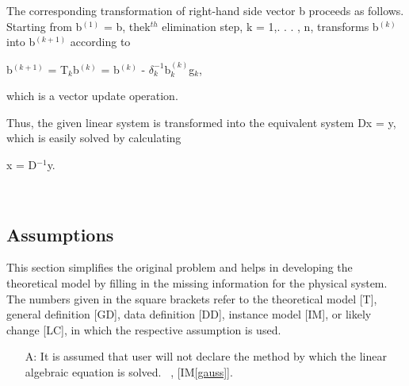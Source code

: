 \documentclass[12pt]{article}
\newcounter{assumpnum} %
\newcommand{\iref}[1]{IM\ref{#1}}
\begin{document}
{{The corresponding transformation of right-hand side vector b proceeds as
follows. Starting from {b$^{(1)}$} = b, the{k$^{th}$} elimination step, k = 1,.
. . , n, transforms {b$^{(k)}$} into {b$^{(k+1)}$} according to

{b$^{(k+1)}$} = {T$_k$}{b$^{(k)}$} = {b$^{(k)}$} -
$\delta_k^{-1}${b$^{(k)}_k$}{g$_k$},

which is a vector update operation. 

Thus, the given linear system is transformed into the equivalent system Dx = y,
which is easily solved by calculating

x = {D$^{-1}$}y.

~\newline



\subsection{Assumptions}

This section simplifies the original problem and helps in developing the
theoretical model by filling in the missing information for the physical
system. The numbers given in the square brackets refer to the theoretical model
[T], general definition [GD], data definition [DD], instance model [IM], or
likely change [LC], in which the respective assumption is used.

\begin{itemize}

\item[A\refstepcounter{assumpnum}\theassumpnum \label{A_programcall}:]
It is assumed that user will not declare the method by which the linear algebraic equation is solved.
~\newline
 [\iref{gaussian}], [\iref{gauss}].


\end{itemize}}}
\end{document}
